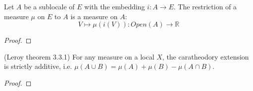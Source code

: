 \begin{lemma}
    Let $A$ be a sublocale of $E$ with the embedding $i : A \rightarrow E$. The restriction of a measure $\mu$ on $E$ to $A$ is a measure on $A$:
    $$V \mapsto \mu(i(V)) : Open(A) \to \mathbb{R}$$
    \label{lem:restriction_to_sublocale}
    \leanok
\end{lemma}
\begin{proof}
    \leanok
\end{proof}

\begin{proposition}
(Leroy theorem 3.3.1)
    \label{prop:strictly_additive}
    \leanok
    For any measure on a local $X$, the caratheodory extension is
    strictly additive, i.e. $\mu (A \cup B) = \mu(A) + \mu(B) - \mu(A \cap B)$.
\end{proposition}
\begin{proof}
    \leanok
\end{proof}


